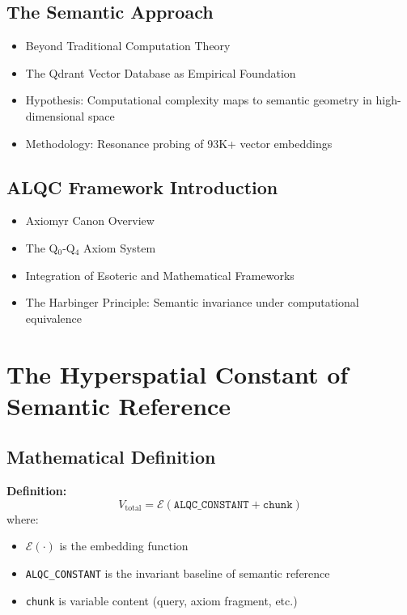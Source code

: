 \subsection{The Semantic Approach}
\begin{itemize}
    \item Beyond Traditional Computation Theory
    \item The Qdrant Vector Database as Empirical Foundation
    \item Hypothesis: Computational complexity maps to semantic geometry in high-dimensional space
    \item Methodology: Resonance probing of 93K+ vector embeddings
\end{itemize}

\subsection{ALQC Framework Introduction}
\begin{itemize}
    \item Axiomyr Canon Overview
    \item The Q$_0$-Q$_4$ Axiom System
    \item Integration of Esoteric and Mathematical Frameworks
    \item The Harbinger Principle: Semantic invariance under computational equivalence
\end{itemize}

\section{The Hyperspatial Constant of Semantic Reference}

\subsection{Mathematical Definition}

\textbf{Definition:}
\begin{equation}
    V_{\text{total}} = \mathcal{E}(\texttt{ALQC\_CONSTANT} + \texttt{chunk})
\end{equation}
where:
\begin{itemize}
    \item $\mathcal{E}(\cdot)$ is the embedding function
    \item \texttt{ALQC\_CONSTANT} is the invariant baseline of semantic reference
    \item \texttt{chunk} is variable content (query, axiom fragment, etc.)
\end{itemize}

